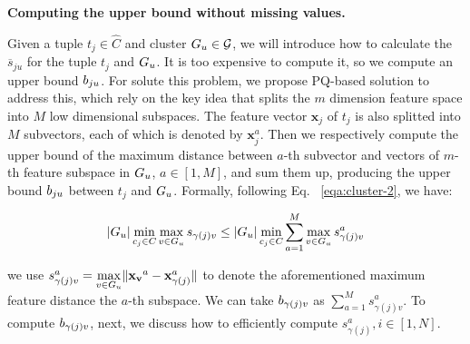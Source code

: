 \noindent \textbf{Computing the upper bound without missing values.} 







Given a tuple $t_j\in \hat{C}$ and cluster $G_u \in \mathcal{G}$, we will introduce how to calculate the $\overline{s}_{ju}$ for the tuple $t_{j}$ and $G_u$. It is too expensive to compute it, so we compute an upper bound $b_{ju}$. For solute this problem, we propose PQ-based solution to address this, which rely on the key idea that splits the $m$ dimension feature space into $M$ low dimensional subspaces. The feature vector $\mathbf{x}_{j}$ of $t_{j}$ is also splitted into $M$ subvectors, each of which is denoted by $\mathbf{x}^a_{j}$. Then we respectively compute the upper bound of the maximum distance between $a$-th subvector and vectors of $m$-th feature subspace in $G_u$, $a\in [1,M]$, and sum them up, producing the upper bound $b_{ju}$ between $t_{j}$ and $G_u$. Formally, following Eq. ~\ref{eqa:cluster-2}, we have:

\begin{equation}\label{eqa:cluster-6}
    \begin{aligned}
        |G_u| \min_{c_j\in C} \max_{v \in G_u} s_{\gamma(j)v} \leq |G_u| \min_{c_j\in C} \sum_{a = 1}^M \max_{v \in G_u} s_{\gamma(j)v}^a
    \end{aligned}
\end{equation}

\noindent we use $s_{\gamma(j)v}^a = \max\limits_{v \in G_u}\lVert \mathbf{x_v}^a - \mathbf{x}^a_{\gamma(j)}\rVert$ to denote the aforementioned maximum feature distance \wrt the $a$-th subspace. We can take $b_{\gamma(j)v}$ as $\sum_{a=1}^{M} s^a_{\gamma(j)v}$. To compute $b_{\gamma(j)v}$, next, we  discuss how to efficiently compute  $s_{\gamma(j)}^a, i\in [1,N]$.

